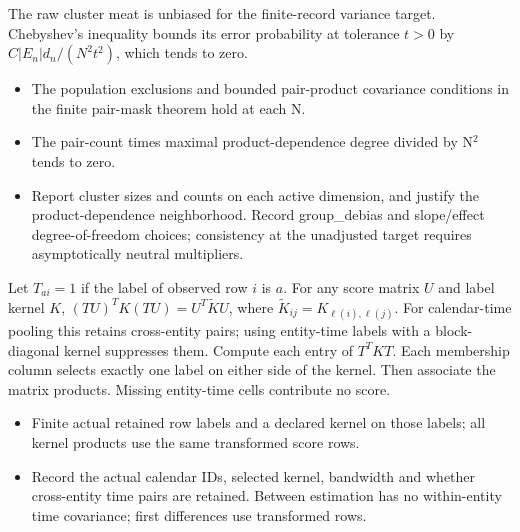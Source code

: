 \expandafter\def\csname statadic@proof@STATADIC-CLUSTER-002\endcsname{The raw cluster meat is unbiased for the finite-record
  variance target. Chebyshev's inequality bounds its error probability at
  tolerance $t>0$ by $C|E_n|d_n/(N^2t^2)$, which tends to zero.}
\expandafter\def\csname statadic@assumptions@STATADIC-CLUSTER-002\endcsname{\begin{itemize}
\item The population exclusions and bounded pair-product covariance conditions in the finite pair-mask theorem hold at each N.
\item The pair-count times maximal product-dependence degree divided by N\ensuremath{{}^2} tends to zero.
\end{itemize}}
\expandafter\def\csname statadic@diagnostics@STATADIC-CLUSTER-002\endcsname{\begin{itemize}
\item Report cluster sizes and counts on each active dimension, and justify the product-dependence neighborhood. Record group\_debias and slope/effect degree-of-freedom choices; consistency at the unadjusted target requires asymptotically neutral multipliers.
\end{itemize}}
\expandafter\def\csname statadic@statement@STATADIC-PANELCOV-003\endcsname{Let $T_{ai}=1$ if the label of observed row $i$ is $a$.
  For any score matrix $U$ and label kernel $K$,
  $(TU)^TK(TU)=U^T\widetilde KU$, where
  $\widetilde K_{ij}=K_{\ell(i),\ell(j)}$.
  For calendar-time pooling this retains cross-entity pairs; using
  entity-time labels with a block-diagonal kernel suppresses them.}
\expandafter\def\csname statadic@proof@STATADIC-PANELCOV-003\endcsname{Compute each entry of $T^TKT$. Each membership column selects
  exactly one label on either side of the kernel. Then associate the matrix
  products. Missing entity-time cells contribute no score.}
\expandafter\def\csname statadic@assumptions@STATADIC-PANELCOV-003\endcsname{\begin{itemize}
\item Finite actual retained row labels and a declared kernel on those labels; all kernel products use the same transformed score rows.
\end{itemize}}
\expandafter\def\csname statadic@diagnostics@STATADIC-PANELCOV-003\endcsname{\begin{itemize}
\item Record the actual calendar IDs, selected kernel, bandwidth and whether cross-entity time pairs are retained. Between estimation has no within-entity time covariance; first differences use transformed rows.
\end{itemize}}
